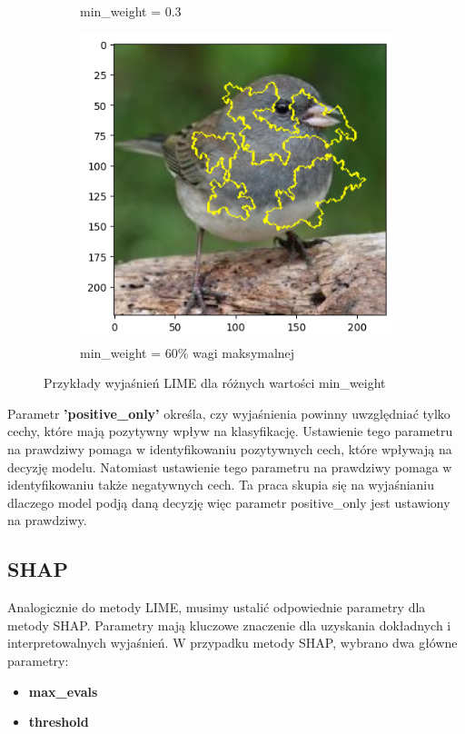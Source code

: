\begin{figure}[h]
\begin{subfigure}[b]{0.3\textwidth}
		\caption{min\_weight = 0.3}  \label{rys:parameters_lime_numsamples_1000}
	\end{subfigure}
	\begin{subfigure}[b]{0.3\textwidth}
		\includegraphics[width=.9\textwidth]{img/parameters/lime/min_weight_06m}
        \caption{min\_weight = 60\% wagi maksymalnej}  \label{rys:parameters_lime_numsamples_5}
	\end{subfigure}
	\caption{Przykłady wyjaśnień LIME dla różnych wartości min\_weight}
\end{figure}

Parametr \textbf{'positive\_only'} określa, czy wyjaśnienia powinny uwzględniać tylko cechy, które mają pozytywny wpływ na klasyfikację.
Ustawienie tego parametru na prawdziwy pomaga w identyfikowaniu pozytywnych cech, które wpływają na decyzję modelu.
Natomiast ustawienie tego parametru na prawdziwy pomaga w identyfikowaniu także negatywnych cech.
Ta praca skupia się na wyjaśnianiu dlaczego model podją daną decyzję więc parametr positive\_only jest ustawiony na prawdziwy.


\subsection*{SHAP}
Analogicznie do metody LIME, musimy ustalić odpowiednie parametry dla metody SHAP.
Parametry mają kluczowe znaczenie dla uzyskania dokładnych i interpretowalnych wyjaśnień.
W przypadku metody SHAP, wybrano dwa główne parametry:
\begin{itemize}
	\item \textbf{max\_evals}
	\item \textbf{threshold}
\end{itemize}

